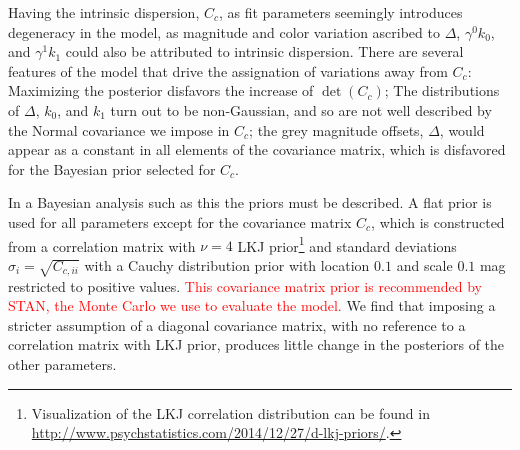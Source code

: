 \documentclass{aastex61}   	%
\begin{document}
\color{black}

Having the intrinsic dispersion, $C_c$, as fit parameters seemingly introduces degeneracy in the model, as magnitude and color variation
ascribed to $\Delta$, $\gamma^0 k_0$, and $\gamma^1 k_1$ could also be attributed to intrinsic dispersion.  There are several features of the model
that drive the assignation of variations away from $C_c$:  Maximizing the posterior disfavors the increase of $\det{(C_c)}$;
The distributions of $\Delta$, $k_0$, and $k_1$ turn out to
be non-Gaussian, and so are not well described by the Normal covariance we impose in $C_c$; the grey magnitude offsets, $\Delta$, would appear as a constant
in all elements of the covariance matrix, which is disfavored for the Bayesian prior selected for $C_c$.

In a Bayesian analysis such as this the priors must be described.  A flat prior is used for all parameters except
for the covariance matrix $C_c$, which is constructed from a correlation matrix with  $\nu=4$  LKJ prior\footnote{
Visualization of the LKJ correlation distribution can be found in \url{http://www.psychstatistics.com/2014/12/27/d-lkj-priors/}.}
\citep{Lewandowski20091989} and standard
deviations $\sigma_i = \sqrt{C_{c,ii}}$ with a  Cauchy distribution prior with location
 $0.1$ and scale $0.1$ mag restricted to positive values.
 \textcolor{red}{This covariance matrix prior is recommended by STAN, the Monte Carlo we use to evaluate the model.}
 We find that imposing a stricter assumption of a
 diagonal covariance matrix, with no reference to a correlation matrix with LKJ prior, produces little change in the posteriors of
 the other parameters.
\end{document}
